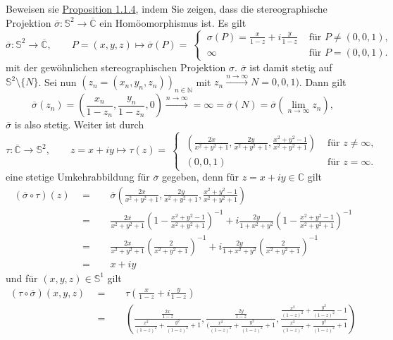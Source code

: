 \documentclass[11pt]{book}
\numberwithin{dummy}{section}
\theoremstyle{nonumberbreak}
\newenvironment{prob}[1][]{\ifthenelse{\equal{#1}{}}{\problem}{\problem[#1]}\rm}{\endproblem}
\newenvironment{sol}[1][]{\ifthenelse{\equal{#1}{}}{\solution}{\solution[#1]}\rm}{\endsolution}
\newcommand{\C}{\mathbb{C}}
\newcommand{\N}{\mathbb{N}}
\newcommand{\Sph}{\mathbb{S}}
\newcommand{\CC}{\overline{\mathbb{C}}}
\newcommand{\la}{\longrightarrow}
\begin{document}
\begin{spacing}{1.4}
\hypertarget{Aeinsdrei}{}
\begin{prob}    %
Beweisen sie \hyperlink{propeinseinsvier}{Proposition 1.1.4}, indem Sie zeigen, dass die stereographische Projektion $\overline{\sigma}: \Sph^2 \la \CC$ ein Homöomorphismus ist.
\begin{sol}
Es gilt 
$$\overline{\sigma}: \Sph^2 \la \CC, \qquad P=(x,y,z) \mapsto \overline{\sigma}(P) = \ \begin{cases} \ \sigma(P)= \frac{x}{1-z}+ i \frac{y}{1-z} & \textrm{ für } P \neq (0,0,1), \\ \ \infty & \textrm{ für } P=(0,0,1). \end{cases}$$
mit der gewöhnlichen stereographischen Projektion $\sigma$. $\overline{\sigma}$ ist damit stetig auf $\Sph^2 \setminus \{N\}$. Sei nun $(z_n=(x_n,y_n,z_n))_{n \in \N}$ mit $z_n \xrightarrow{n \to \infty} N= 0,0,1)$. Dann gilt 
$$\overline{\sigma}(z_n) = \left(\frac{x_n}{1-z_n}, \frac{y_n}{1-z_n}, 0 \right)  \xrightarrow{n \to \infty}  = \infty =  \overline{\sigma}(N) = \overline{\sigma}\left( \lim_{n \to \infty} z_n\right),$$
$\overline{\sigma}$ is also stetig. Weiter ist durch 
$$\tau: \CC \la \Sph^2, \qquad z=x+iy \mapsto \tau(z)=\ \begin{cases} \ \left( \frac{2x}{x^2+y^2+1}, \frac{2y}{x^2+y^2+1}, \frac{x^2+y^2-1}{x^2+y^2+1} \right) & \textrm{ für } z \neq \infty, \\ \ (0,0,1) & \textrm{ für }z=\infty. \end{cases}$$
eine stetige Umkehrabbildung für $\overline{\sigma}$ gegeben, denn für $z=x+iy\in \C$ gilt
\begin{alignat*}{5}
(\overline{\sigma} \circ \tau)(z)\ \ &=&& \ \  \overline{\sigma} \left( \frac{2x}{x^2+y^2+1}, \frac{2y}{x^2+y^2+1}, \frac{x^2+y^2-1}{x^2+y^2+1} \right) \\[6pt]
&=&& \ \ \frac{2x}{x^2+y^2+1} \left( 1- \frac{x^2+y^2-1}{x^2+y^2+1}\right)^{-1} + i \frac{2y}{1+x^2+y^2} \left( 1- \frac{x^2+y^2-1}{x^2+y^2+1}\right)^{-1} \\[6pt]
&=&& \ \ \frac{2x}{x^2+y^2+1} \left(\frac{2}{x^2+y^2+1}\right)^{-1} + i \frac{2y}{1+x^2+y^2} \left(\frac{2}{x^2+y^2+1}\right)^{-1} \\[6pt]
&=&& \ \ x+iy
\end{alignat*}
und für $(x,y,z) \in \Sph^1$ gilt
\begin{alignat*}{5}
(\tau \circ \overline{\sigma})(x,y,z) \ \ &=&& \ \ \tau \left( \frac{x}{1-z} + i \frac{y}{1-z} \right) \\[6pt]
&=&& \ \ \left( \frac{\frac{2x}{1-z}}{\frac{x^2}{(1-z)^2}+\frac{y^2}{(1-z)^2}+1}, \frac{\frac{2y}{1-z}}{(\frac{x^2}{(1-z)^2}+\frac{y^2}{(1-z)^2}+1}, \frac{ \frac{x^2}{(1-z)^2} + \frac{y^2}{(1-z)^2} -1}{\frac{x^2}{(1-z)^2} + \frac{y^2}{(1-z)^2} + 1} \right) \\[6pt]

\end{alignat*}
\end{sol}
\end{prob}
\end{spacing}
\end{document}
